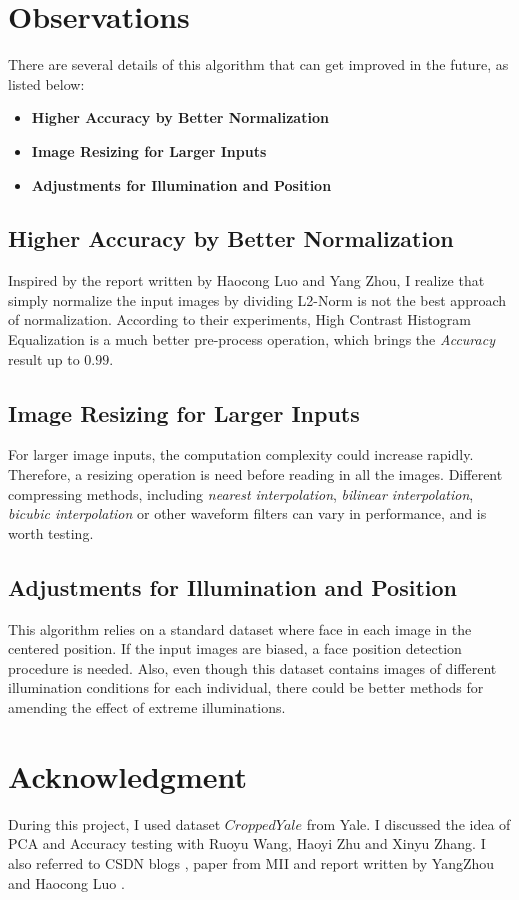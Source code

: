 \documentclass[10pt,journal]{IEEEtran}
\renewcommand{\[}{\begin{equation*} \begin{aligned}} %
\renewcommand{\]}{\end{aligned} \end{equation*}}
\begin{document}
\section{\textbf{\large Observations}}
There are several details of this algorithm that can get improved in the future, as listed below:
\begin{itemize}
	\item \textbf{Higher Accuracy by Better Normalization}
	\item \textbf{Image Resizing for Larger Inputs}
	\item \textbf{Adjustments for Illumination and Position}
\end{itemize}

\subsection{Higher Accuracy by Better Normalization}
Inspired by the report written by Haocong Luo and Yang Zhou, I realize that simply normalize the input images by dividing L2-Norm is not the best approach of normalization. According to their experiments, High Contrast Histogram Equalization is a much better pre-process operation, which brings the \textit{Accuracy} result up to $0.99$.

\subsection{Image Resizing for Larger Inputs}
For larger image inputs, the computation complexity could increase rapidly. Therefore, a resizing operation is need before reading in all the images. Different compressing methods, including \textit{nearest interpolation}, \textit{bilinear interpolation}, \textit{bicubic interpolation} or other waveform filters can vary in performance, and is worth testing.

\subsection{Adjustments for Illumination and Position}
This algorithm relies on a standard dataset where face in each image in the centered position. If the input images are biased, a face position detection procedure is needed. Also, even though this dataset contains images of different illumination conditions for each individual, there could be better methods for amending the effect of extreme illuminations.

\section*{\textbf{\large Acknowledgment}}
During this project, I used dataset $CroppedYale$ from Yale. I discussed the idea of PCA and Accuracy testing with Ruoyu Wang, Haoyi Zhu and Xinyu Zhang. I also referred to CSDN blogs \cite{csdn1}, paper from MII \cite{cnki1} and report written by YangZhou \cite{report1} and Haocong Luo \cite{report2}.



\end{document}
